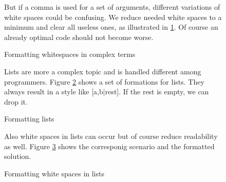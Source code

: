 \documentclass{article}
\begin{document}
 
\begin{figure}[h]
But if a comma is used for a set of arguments, different variations of white spaces could be confusing. We reduce needed white spaces to a minimum and clear all useless ones, as illustrated in \ref{lst:complextTermWhitspace}. Of course an already optimal code should not become worse.\\


\begin{minipage}{.5\textwidth}

\end{minipage}
\hfill
\begin{minipage}{.5\textwidth}

\end{minipage}

\caption{Formatting whitespaces in complex terms}
\label{lst:complextTermWhitspace}
\end{figure}



\begin{figure}[h]
Lists are more a complex topic and is handled different among programmers. Figure \ref{lst:lists} shows a set of formations for lists. They always result in a style like [a,b$|$rest]. If the rest is empty, we can drop it.\\

\begin{minipage}{.5\textwidth}

\end{minipage}
\hfill
\begin{minipage}{.5\textwidth}

\end{minipage}

\caption{Formatting lists}
\label{lst:lists}
\end{figure}


\begin{figure}[h]
Also white spaces in lists can occur but of course reduce readability as well. Figure \ref{lst:listWithesaces} shows the corresponig scenario and the formatted solution.\\

\begin{minipage}{.5\textwidth}

\end{minipage}
\hfill
\begin{minipage}{.5\textwidth}

\end{minipage}

\caption{Formatting white spaces in lists}
\label{lst:listWithesaces}
\end{figure}
\end{document}
